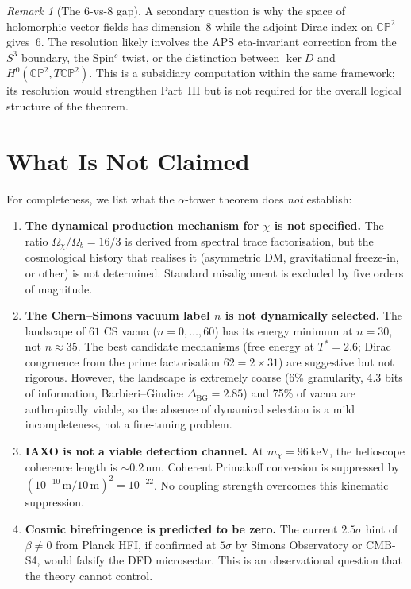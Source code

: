 \documentclass[11pt]{article}
\theoremstyle{definition}
\theoremstyle{remark}
\newtheorem*{remark}{Remark}
\newcommand{\CP}{\mathbb{CP}}
\newcommand{\keV}{\,\mathrm{keV}}
\begin{document}
\begin{remark}[The 6-vs-8 gap]
A secondary question is why the space of holomorphic vector fields
has dimension~$8$ while the adjoint Dirac index on $\CP^2$ gives~$6$.
The resolution likely involves the APS eta-invariant correction from
the $S^3$ boundary, the Spin$^c$ twist, or the distinction between
$\ker D$ and $H^0(\CP^2, T\CP^2)$.  This is a subsidiary computation
within the same framework; its resolution would strengthen Part~III
but is not required for the overall logical structure of the theorem.
\end{remark}


\section{What Is Not Claimed}
\label{sec:not}

For completeness, we list what the $\alpha$-tower theorem does
\emph{not} establish:

\begin{enumerate}
\item \textbf{The dynamical production mechanism for $\chi$ is not
  specified.}  The ratio $\Omega_\chi/\Omega_b = 16/3$ is derived
  from spectral trace factorisation, but the cosmological history
  that realises it (asymmetric DM, gravitational freeze-in, or other)
  is not determined.  Standard misalignment is excluded by five orders
  of magnitude.

\item \textbf{The Chern--Simons vacuum label $n$ is not dynamically
  selected.}  The landscape of $61$ CS vacua ($n = 0, \ldots, 60$)
  has its energy minimum at $n = 30$, not $n \approx 35$.  The best
  candidate mechanisms (free energy at $T^* = 2.6$; Dirac congruence
  from the prime factorisation $62 = 2 \times 31$) are suggestive
  but not rigorous.  However, the landscape is extremely coarse
  (6\% granularity, 4.3 bits of information, Barbieri--Giudice
  $\Delta_{\mathrm{BG}} = 2.85$) and 75\% of vacua are
  anthropically viable, so the absence of dynamical selection is a
  mild incompleteness, not a fine-tuning problem.

\item \textbf{IAXO is not a viable detection channel.}  At
  $m_\chi = 96\keV$, the helioscope coherence length is $\sim 0.2\,$nm.
  Coherent Primakoff conversion is suppressed by $(10^{-10}\,\mathrm{m}
  / 10\,\mathrm{m})^2 = 10^{-22}$.  No coupling strength overcomes
  this kinematic suppression.

\item \textbf{Cosmic birefringence is predicted to be zero.}  The
  current $2.5\sigma$ hint of $\beta \neq 0$ from Planck HFI, if
  confirmed at $5\sigma$ by Simons Observatory or CMB-S4, would
  falsify the DFD microsector.  This is an observational question
  that the theory cannot control.
\end{enumerate}
\end{document}
